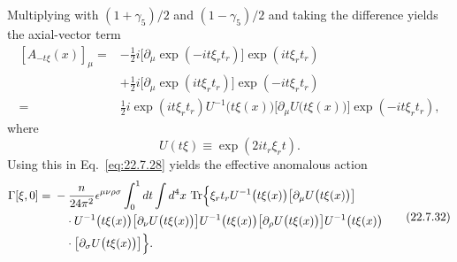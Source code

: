 Multiplying with $(1+\gamma_5)/2$ and $(1-\gamma_5)/2$ and taking the
difference yields the axial-vector term
\begin{equation}
 \begin{aligned}
 [A_{-t\xi}(x)]_\mu
 ={}&-\frac{1}{2}i
 \bigl[\partial_\mu\exp(-it\xi_rt_r)\bigr]\exp(it\xi_rt_r)
 \\
 &+\frac{1}{2}i
 \bigl[\partial_\mu\exp(it\xi_rt_r)\bigr]\exp(-it\xi_rt_r)
 \\
 ={}&\frac{1}{2}i\exp(it\xi_rt_r)
 U^{-1}\bigl(t\xi(x)\bigr)
 \bigl[\partial_\mu U\bigl(t\xi(x)\bigr)\bigr]
 \exp(-it\xi_rt_r),
 \end{aligned}
 \tag{22.7.30}\label{eq:22.7.30}
\end{equation}
where
\begin{equation}
 U(t\xi)\equiv\exp(2it_r\xi_rt).
 \tag{22.7.31}\label{eq:22.7.31}
\end{equation}
Using this in Eq.~\eqref{eq:22.7.28} yields the effective anomalous action
\begin{equation}
 \begin{aligned}
 \Gamma[\xi,0]
 ={}&-\frac{n}{24\pi^2}\epsilon^{\mu\nu\rho\sigma}
 \int_0^1dt\int d^4x\,
 \operatorname{Tr}\Bigl\{
 \xi_rt_rU^{-1}\bigl(t\xi(x)\bigr)
 \bigl[\partial_\mu U\bigl(t\xi(x)\bigr)\bigr]
 \\
 &\quad{}\cdot U^{-1}\bigl(t\xi(x)\bigr)
 \bigl[\partial_\nu U\bigl(t\xi(x)\bigr)\bigr]
 U^{-1}\bigl(t\xi(x)\bigr)
 \bigl[\partial_\rho U\bigl(t\xi(x)\bigr)\bigr]
 U^{-1}\bigl(t\xi(x)\bigr)
 \\
 &\quad{}\cdot
 \bigl[\partial_\sigma U\bigl(t\xi(x)\bigr)\bigr]
 \Bigr\}.
 \end{aligned}
 \tag{22.7.32}\label{eq:22.7.32}
\end{equation}


